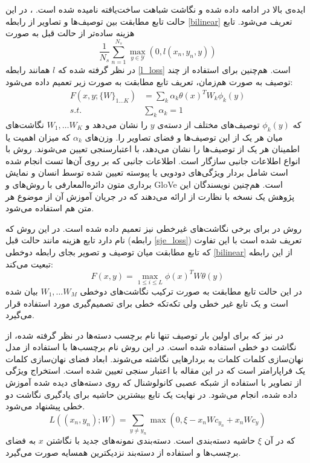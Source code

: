 ایده‌ی بالا در \cite{Akata2015} ادامه داده شده و نگاشت شباهت ساخت‌یافته
نامیده شده است.
، در این حالت تابع مطابقت بین توصیف‌ها و تصاویر از رابطه  \eqref{bilinear} تعریف می‌شود. تابع هزینه ساده‌تر از حالت قبل به صورت
\begin{equation} \label{sje_loss}
\frac{1}{N_s} \sum_{n=1}^{N_s} \max_{y \in \mathcal{Y}}(0, l(x_n, y_n, y))
\end{equation}
در نظر گرفته شده که $l$ همانند رابطه \eqref{l_loss} است. هم‌چنین برای استفاده از چند توصیف به صورت هم‌زمان، تعریف تابع مطابقت به صورت زیر تعمیم داده می‌شود:
\begin{align}
F(x,y;\{W\}_{1\ldots K}) &= \sum_k \alpha_k \theta(x)^T W_k \phi_k(y)  \\
s.t. & \sum_k \alpha_k = 1 \nonumber
\end{align}
که $\phi_k(y)$ توصیف‌های مختلف از دسته‌ی $y$ را نشان می‌دهد و $W_1, \ldots W_K$ نگاشت‌های میان هر یک از این توصیف‌ها و فضای تصاویر را. وزن‌های $\alpha_k$ که میزان اهمیت یا اطمینان  هر یک از توصیف‌ها را نشان می‌دهد، با اعتبارسنجی تعیین می‌شوند. روش  با انواع اطلاعات جانبی سازگار است. اطلاعات جانبی که بر روی آن‌ها تست انجام شده است شامل بردار ویژگی‌های دودویی یا پیوسته تعیین شده توسط انسان و نمایش برداری متون دائره‌المعارفی با روش‌های  \cite{word2vec} و GloVe
\cite{pennington2014glove}
است. هم‌چنین نویسندگان این پژوهش یک نسخه با نظارت از  ارائه می‌دهند که در جریان آموزش آن از موضوع هر متن هم استفاده می‌شود.

 روش  در \cite{Xian2016} برای برخی نگاشت‌های غیرخطی نیز تعمیم داده شده است. در این روش  که
 نام دارد تابع هزینه مانند حالت قبل (رابطه \eqref{sje_loss}) تعریف شده است با این تفاوت که تابع مطابقت میان توصیف و تصویر بجای رابطه دوخطی \eqref{bilinear} از این رابطه تبعیت می‌کند:
 \begin{equation} \label{latem}
 F(x,y) = \max_{1\leq i \leq L} \phi(x)^TW \theta(y)
 \end{equation}
در این حالت تابع مطابقت به صورت ترکیب نگاشت‌های دوخطی $W_1, \ldots W_M$ بیان شده است و یک تابع غیر خطی ولی تکه‌تکه خطی برای تصمیم‌گیری مورد استفاده قرار می‌گیرد.


در
\cite{devise}
نیز که برای اولین بار توصیف تنها نام برچسب دسته‌ها در نظر گرفته شده، از نگاشت دو خطی استفاده شده است. در این روش نام برچسب‌ها با استفاده از مدل نهان‌سازی کلمات  کلمات به بردارهایی نگاشته می‌شوند. ابعاد فضای نهان‌سازی کلمات یک فراپارامتر است که در این مقاله با اعتبار سنجی تعیین شده است. استخراج ویژگی از  تصاویر  با استفاده از شبکه عصبی کانولوشنال
\cite{alexnet}
که روی دسته‌های دیده شده آموزش داده شده، انجام می‌شود. در نهایت یک تابع بیشترین حاشیه
برای یادگیری نگاشت دو خطی پیشنهاد می‌شود.
\begin{equation}
 L((x_n, y_n);W) = \sum_{y\neq y_n} \max(0, \xi  - x_nWc_{y_n} + x_nWc_y)
\end{equation}
که در آن $\xi$ حاشیه دسته‌بندی است. دسته‌بندی نمونه‌های جدید با نگاشتن $x$ به فضای برچسب‌ها و استفاده از دسته‌بند نزدیکترین همسایه صورت می‌گیرد.

